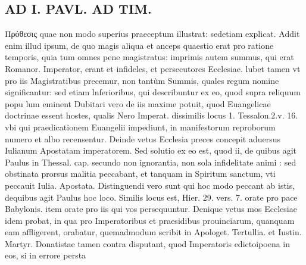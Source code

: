 \documentclass{article}
\begin{document}
\begin{pages}
\section*{AD I. PAVL. AD TIM. }
\marginpar{[ p.48 ]}\pstart Πρόθεσις quae non modo superius praeceptum illustrat: sedetiam explicat. Addit enim illud ipsum, de quo magis aliqua et anceps quaestio erat pro ratione temporis, quia tum omnes pene magistratus: imprimis autem summus, qui erat Romanor. Imperator, erant et infideles, et persecutores Ecclesiae. lubet tamen vt pro iis Magistratibus precemur, non tantùm Summis, quales regum nomine significantur: sed etiam lnferioribus, qui describuntur ex eo, quod supra reliquum popu lum eminent Dubitari vero de iis maxime potuit, quod Euangelicae doctrinae essent hostes, qualis Nero Imperat. dissimilis locus 1. Tessalon.2.v. 16. vbi qui praedicationem Euangelii impediunt, in manifestorum reproborum numero et albo recensentur. Deinde vetus Ecclesia preces concepit aduersus Iulianum Apostatam imperatorem. Sed solutio ex eo est, quod ii, de quibus agit Paulus in Thessal. cap. secundo non ignorantia, non sola infidelitate animi : sed obstinata prorsus malitia peccabant, et tanquam in Spiritum sanctum, vti peccauit Iulia. Apostata. Distinguendi vero sunt qui hoc modo peccant ab istis, dequibus agit Paulus hoc loco.  \pend\pstart Similis locus est, Hier. 29. vers. 7. orate pro pace Babylonis. item orate pro iis qui vos persequuntur. Denique vetus mos Ecclesiae idem probat, in qua pro Imperatoribus et praesidibus prouinciarum, quanquam eam affligerent, orabatur, quemadmodum scribit in Apologet. Tertullia. et Iustin. Martyr.  \pend\pstart Donatistae tamen contra disputant, quod Imperatoris edictoipoena in eos, si in errore persta\pend

\end{pages}
\end{document}
